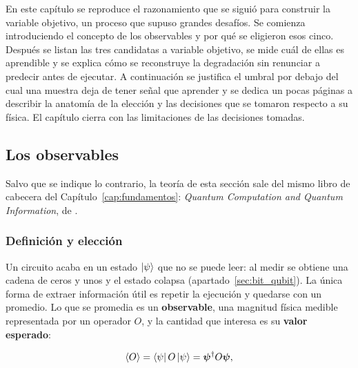 En este capítulo se reproduce el razonamiento que se siguió para construir la variable
objetivo, un proceso que supuso grandes desafíos. Se comienza introduciendo el concepto de los
observables y por qué se eligieron esos cinco. Después se listan las tres candidatas a variable
objetivo, se mide cuál de ellas es aprendible y se explica cómo se reconstruye la degradación
sin renunciar a predecir antes de ejecutar. A continuación se justifica el umbral por debajo
del cual una muestra deja de tener señal que aprender y se dedica un pocas páginas a describir
la anatomía de la elección y las decisiones que se tomaron respecto a su física. El capítulo
cierra con las limitaciones de las decisiones tomadas.


\subsection{Los observables}
\label{sec:observables}

Salvo que se indique lo contrario, la teoría de esta sección sale del mismo libro de cabecera del Capítulo~\ref{cap:fundamentos}: \textit{Quantum Computation and Quantum Information}, de .


\subsubsection{Definición y elección}
\label{sec:cinco_observables}

Un circuito acaba en un estado $\ket{\psi}$ que no se puede leer: al medir se obtiene una
cadena de ceros y unos y el estado colapsa (apartado~\ref{sec:bit_qubit}). La única forma de
extraer información útil es repetir la ejecución y quedarse con un promedio. Lo que se
promedia es un \textbf{observable}, una magnitud física medible representada por un operador
$O$, y la cantidad que interesa es su \textbf{valor esperado}:

\begin{equation}
\label{eq:valor_esperado}
\langle O \rangle = \bra{\psi} O \ket{\psi} = \boldsymbol{\psi}^\dagger O \boldsymbol{\psi} ,
\end{equation}

